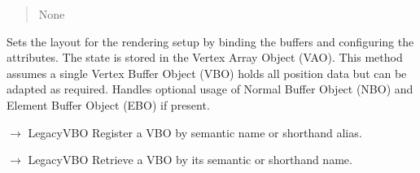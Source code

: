 \documentclass[a4paper,10pt,english,openany,oneside]{sphinxmanual}
\begin{document}
\begin{fulllineitems}
\begin{fulllineitems}
\begin{quote}
\begin{description}
\sphinxAtStartPar
None

\end{description}\end{quote}

\sphinxAtStartPar
Sets the layout for the rendering setup by binding the buffers and configuring the attributes.
The state is stored in the Vertex Array Object (VAO). This method assumes a single Vertex Buffer
Object (VBO) holds all position data but can be adapted as required. Handles optional usage of
Normal Buffer Object (NBO) and Element Buffer Object (EBO) if present.

\end{fulllineitems}


\begin{fulllineitems}
\label{\detokenize{api/buffers:picogl.backend.modern.core.vertex.array.object.VertexArrayObject.add_vbo_object}}
\pysigstartsignatures
\pysiglinewithargsret
{}
{\sphinxparamcomma {}}
{{ $\rightarrow$ LegacyVBO}}
\pysigstopsignatures
\sphinxAtStartPar
Register a VBO by semantic name or shorthand alias.

\end{fulllineitems}


\begin{fulllineitems}
\label{\detokenize{api/buffers:picogl.backend.modern.core.vertex.array.object.VertexArrayObject.get_vbo_object}}
\pysigstartsignatures
\pysiglinewithargsret
{}
{}
{{ $\rightarrow$ LegacyVBO}}
\pysigstopsignatures
\sphinxAtStartPar
Retrieve a VBO by its semantic or shorthand name.


\end{fulllineitems}
\end{fulllineitems}
\end{document}
